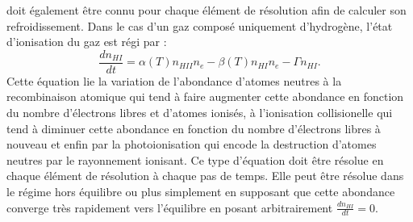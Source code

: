  doit également être connu pour chaque élément de résolution afin de calculer son refroidissement. Dans le cas d'un gaz composé uniquement d'hydrogène, l'état d'ionisation du gaz est régi par :
\begin{equation}
\frac{dn_{HI}}{dt}=\alpha(T) n_{HII} n_e-\beta(T) n_{HI}n_e-\Gamma n_{HI}.
\label{e:eint}
\end{equation}
Cette équation lie la variation de l'abondance d'atomes neutres à la recombinaison atomique  qui tend à faire augmenter cette abondance en fonction du nombre d'électrons libres et d'atomes ionisés, à l'ionisation collisionelle  qui tend à diminuer cette abondance en fonction du nombre d'électrons libres à nouveau et enfin par la photoionisation  qui encode la destruction d'atomes neutres par le rayonnement ionisant. Ce type d'équation doit être résolue en chaque élément de résolution à chaque pas de temps. Elle peut être résolue dans le régime hors équilibre  ou plus simplement en supposant que cette abondance converge très rapidement vers l'équilibre en posant arbitrairement $\frac{dn_{HI}}{dt}=0$.

